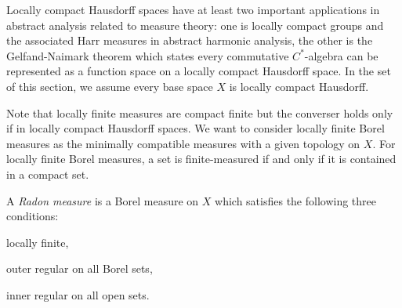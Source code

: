 \documentclass{../note}
\begin{document}
Locally compact Hausdorff spaces have at least two important applications in abstract analysis related to measure theory: one is locally compact groups and the associated Harr measures in abstract harmonic analysis, the other is the Gelfand-Naimark theorem which states every commutative $C^*$-algebra can be represented as a function space on a locally compact Hausdorff space.
In the set of this section, we assume every base space $X$ is locally compact Hausdorff.

Note that locally finite measures are compact finite but the converser holds only if in locally compact Hausdorff spaces.
We want to consider locally finite Borel measures as the minimally compatible measures with a given topology on $X$.
For locally finite Borel measures, a set is finite-measured if and only if it is contained in a compact set.
\begin{defn}
A \emph{Radon measure} is a Borel measure on $X$ which satisfies the following three conditions:
\begin{parts}
\item locally finite,
\item outer regular on all Borel sets,
\item inner regular on all open sets.
\end{parts}
\end{defn}
\end{document}
